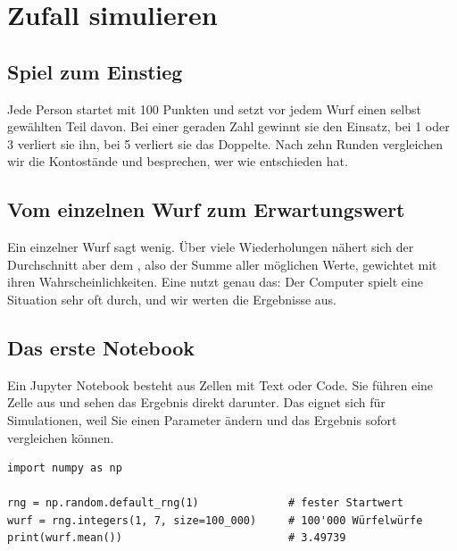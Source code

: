 \chapter{Zufall simulieren}



\section{Spiel zum Einstieg}
Jede Person startet mit 100 Punkten und setzt vor jedem Wurf einen selbst gewählten Teil davon. Bei einer geraden Zahl gewinnt sie den Einsatz, bei 1 oder 3 verliert sie ihn, bei 5 verliert sie das Doppelte. Nach zehn Runden vergleichen wir die Kontostände und besprechen, wer wie entschieden hat.

\section{Vom einzelnen Wurf zum Erwartungswert}
Ein einzelner Wurf sagt wenig. Über viele Wiederholungen nähert sich der Durchschnitt aber dem , also der Summe aller möglichen Werte, gewichtet mit ihren Wahrscheinlichkeiten. Eine  nutzt genau das: Der Computer spielt eine Situation sehr oft durch, und wir werten die Ergebnisse aus.

\section{Das erste Notebook}
Ein Jupyter Notebook besteht aus Zellen mit Text oder Code. Sie führen eine Zelle aus und sehen das Ergebnis direkt darunter. Das eignet sich für Simulationen, weil Sie einen Parameter ändern und das Ergebnis sofort vergleichen können.

\begin{lstlisting}[style=Python]
import numpy as np

rng = np.random.default_rng(1)              # fester Startwert
wurf = rng.integers(1, 7, size=100_000)     # 100'000 Würfelwürfe
print(wurf.mean())                          # 3.49739
\end{lstlisting}

